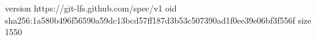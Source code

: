 version https://git-lfs.github.com/spec/v1
oid sha256:1a580b496f56590a59dc13bcd57ff187d3b53c507390ad1f0ee39e06bf3f556f
size 1550
